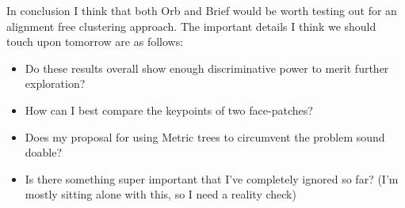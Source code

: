 \documentclass{article}
\begin{document}
In conclusion I think that both Orb and Brief would be worth testing out for an 
alignment free clustering approach. The important details I think we should 
touch upon tomorrow are as follows:
\begin{itemize}
\item{Do these results overall show enough discriminative power to merit 
further exploration?}
\item{How can I best compare the keypoints of two face-patches?}
\item{Does my proposal for using Metric trees to circumvent the problem sound 
doable?}
\item{Is there something super important that I've completely ignored so far?  
(I'm mostly sitting alone with this, so I need a reality check)}
\end{itemize}








% 
% 
% 
% 
\end{document}
